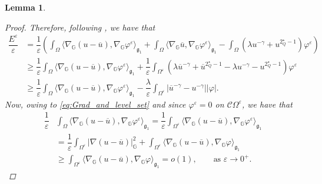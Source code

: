 \documentclass[11pt]{amsart}
\numberwithin{equation}{section} %
\newtheorem{lemma}[teo]{Lemma}
\theoremstyle{definition}
\begin{document}
\begin{lemma}
\begin{proof}
		
		\noindent Therefore, following \cite{Haitao}, we have that
		\begin{equation}\label{eq:Pre2.12Haitao}
			\begin{aligned}
				\dfrac{E^{\varepsilon}}{\varepsilon} &= \dfrac{1}{\varepsilon}\left( 
				\int_{\Omega}\langle \nabla_{\mathbb{G}}(u-\overline{u}),\nabla_{\mathbb{G}}\varphi^{\varepsilon}\rangle_{\mathfrak{g}_{1}} +  
				\int_{\Omega}\langle\nabla_{\mathbb{G}}\overline{u},\nabla_{\mathbb{G}}\varphi^{\varepsilon}\rangle_{\mathfrak{g}_{1}} -  \int_{\Omega}(\lambda u^{-\gamma}+u^{2^{\star}_{Q}-1})\varphi^{\varepsilon} \right)\\
				&\geq \dfrac{1}{\varepsilon} \int_{\Omega} \langle\nabla_{\mathbb{G}}(u-\overline{u}),\nabla_{\mathbb{G}}\varphi^{\varepsilon}\rangle_{\mathfrak{g}_{1}} + \dfrac{1}{\varepsilon}\int_{\Omega^{\varepsilon}}(\lambda \overline{u}^{-\gamma} + \overline{u}^{2^{\star}_{Q}-1} - \lambda u^{-\gamma} - u^{2^{\star}_{Q}-1} )\varphi^{\varepsilon} \\
				&\geq \dfrac{1}{\varepsilon} \int_{\Omega} \langle\nabla_{\mathbb{G}}(u-\overline{u}),\nabla_{\mathbb{G}}\varphi^{\varepsilon}\rangle_{\mathfrak{g}_{1}} - \dfrac{\lambda}{\varepsilon} \int_{\Omega^{\varepsilon}}|\overline{u}^{-\gamma}-u^{-\gamma}||\varphi|.
			\end{aligned}
		\end{equation}
		Now, owing to \eqref{eq:Grad_and_level_set} and since $\varphi^{\varepsilon}=0$ on $\mathcal{C}\Omega^{\varepsilon}$, we have that
		\begin{equation}\label{eq:LocalHaitao}
			\begin{aligned}
				\dfrac{1}{\varepsilon} &\int_{\Omega} \langle\nabla_{\mathbb{G}}(u-\overline{u}),\nabla_{\mathbb{G}}\varphi^{\varepsilon}\rangle_{\mathfrak{g}_{1}} = \dfrac{1}{\varepsilon} \int_{\Omega^{\varepsilon}} \langle\nabla_{\mathbb{G}}(u-\overline{u}),\nabla_{\mathbb{G}}\varphi^{\varepsilon}\rangle_{\mathfrak{g}_{1}}\\
				&=\dfrac{1}{\varepsilon}\int_{\Omega^{\varepsilon}}|\nabla(u-\overline{u})|_{\mathbb{G}}^2 + \int_{\Omega^{\varepsilon}}\langle \nabla_{\mathbb{G}}(u-\overline{u}),\nabla_{\mathbb{G}}\varphi \rangle_{\mathfrak{g}_{1}} \\
				&\geq \int_{\Omega^{\varepsilon}}\langle \nabla_{\mathbb{G}}(u-\overline{u}),\nabla_{\mathbb{G}}\varphi \rangle_{\mathfrak{g}_{1}}  = o(1), \qquad \textrm{as } \varepsilon \to 0^{+}.

\end{aligned}
\end{equation}
\end{proof}
\end{lemma}
\end{document}
